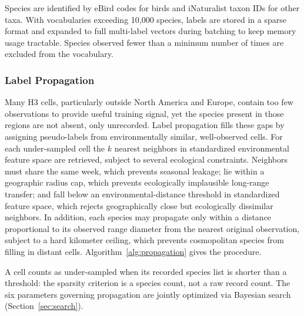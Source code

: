 Species are identified by eBird codes for birds and iNaturalist taxon IDs for other taxa. With vocabularies exceeding 10,000 species, labels are stored in a sparse format and expanded to full multi-label vectors during batching to keep memory usage tractable. Species observed fewer than a minimum number of times are excluded from the vocabulary.

\subsubsection{Label Propagation}
\label{sec:propagation}

Many H3 cells, particularly outside North America and Europe, contain too few observations to provide useful training signal, yet the species present in those regions are not absent, only unrecorded. Label propagation fills these gaps by assigning pseudo-labels from environmentally similar, well-observed cells. For each under-sampled cell the $k$ nearest neighbors in standardized environmental feature space are retrieved, subject to several ecological constraints. Neighbors must share the same week, which prevents seasonal leakage; lie within a geographic radius cap, which prevents ecologically implausible long-range transfer; and fall below an environmental-distance threshold in standardized feature space, which rejects geographically close but ecologically dissimilar neighbors. In addition, each species may propagate only within a distance proportional to its observed range diameter from the nearest original observation, subject to a hard kilometer ceiling, which prevents cosmopolitan species from filling in distant cells. Algorithm~\ref{alg:propagation} gives the procedure.

A cell counts as under-sampled when its recorded species list is shorter than a threshold: the sparsity criterion is a species count, not a raw record count. The six parameters governing propagation are jointly optimized via Bayesian search (Section~\ref{sec:search}).


